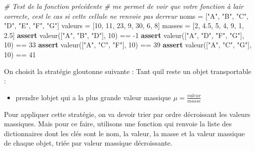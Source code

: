 \documentclass[
  paper=a4,
  ,captions=tableheading
]{scrartcl}
\newenvironment{Shaded}{}{}
\newcommand{\CommentTok}[1]{\textcolor[rgb]{0.38,0.63,0.69}{\textit{#1}}}
\newcommand{\ControlFlowTok}[1]{\textcolor[rgb]{0.00,0.44,0.13}{\textbf{#1}}}
\newcommand{\DecValTok}[1]{\textcolor[rgb]{0.25,0.63,0.44}{#1}}
\newcommand{\FloatTok}[1]{\textcolor[rgb]{0.25,0.63,0.44}{#1}}
\newcommand{\NormalTok}[1]{#1}
\newcommand{\OperatorTok}[1]{\textcolor[rgb]{0.40,0.40,0.40}{#1}}
\newcommand{\StringTok}[1]{\textcolor[rgb]{0.25,0.44,0.63}{#1}}
\providecommand{\tightlist}{%
  \setlength{\itemsep}{0pt}\setlength{\parskip}{0pt}}
\begin{document}
\begin{Shaded}
\begin{Highlighting}[]
\CommentTok{\# Test de la fonction précédente}
\CommentTok{\# me permet de voir que votre fonction à l\textquotesingle{}air correcte, c\textquotesingle{}est le cas si cette cellule ne renvoie pas d\textquotesingle{}erreur}
\NormalTok{noms }\OperatorTok{=}\NormalTok{ [}\StringTok{"A"}\NormalTok{, }\StringTok{"B"}\NormalTok{, }\StringTok{"C"}\NormalTok{, }\StringTok{"D"}\NormalTok{, }\StringTok{"E"}\NormalTok{, }\StringTok{"F"}\NormalTok{, }\StringTok{"G"}\NormalTok{]}
\NormalTok{valeurs }\OperatorTok{=}\NormalTok{ [}\DecValTok{10}\NormalTok{, }\DecValTok{11}\NormalTok{, }\DecValTok{23}\NormalTok{, }\DecValTok{9}\NormalTok{, }\DecValTok{30}\NormalTok{, }\DecValTok{6}\NormalTok{, }\DecValTok{8}\NormalTok{]}
\NormalTok{masses }\OperatorTok{=}\NormalTok{ [}\DecValTok{2}\NormalTok{, }\FloatTok{4.5}\NormalTok{, }\DecValTok{5}\NormalTok{, }\DecValTok{4}\NormalTok{, }\DecValTok{9}\NormalTok{, }\DecValTok{1}\NormalTok{, }\FloatTok{2.5}\NormalTok{]}
\ControlFlowTok{assert}\NormalTok{ valeur([}\StringTok{"A"}\NormalTok{, }\StringTok{"B"}\NormalTok{, }\StringTok{"D"}\NormalTok{], }\DecValTok{10}\NormalTok{) }\OperatorTok{==} \OperatorTok{{-}}\DecValTok{1}
\ControlFlowTok{assert}\NormalTok{ valeur([}\StringTok{"A"}\NormalTok{, }\StringTok{"D"}\NormalTok{, }\StringTok{"F"}\NormalTok{, }\StringTok{"G"}\NormalTok{], }\DecValTok{10}\NormalTok{) }\OperatorTok{==} \DecValTok{33}
\ControlFlowTok{assert}\NormalTok{ valeur([}\StringTok{"A"}\NormalTok{, }\StringTok{"C"}\NormalTok{, }\StringTok{"F"}\NormalTok{], }\DecValTok{10}\NormalTok{) }\OperatorTok{==} \DecValTok{39}
\ControlFlowTok{assert}\NormalTok{ valeur([}\StringTok{"A"}\NormalTok{, }\StringTok{"C"}\NormalTok{, }\StringTok{"G"}\NormalTok{], }\DecValTok{10}\NormalTok{) }\OperatorTok{==} \DecValTok{41}
\end{Highlighting}
\end{Shaded}

On choisit la stratégie gloutonne suivante : Tant qu\textquotesingle il
reste un objet transportable :

\begin{itemize}
\tightlist
\item
  prendre l\textquotesingle objet qui a la plus grande valeur massique
  \(\mu=\frac{valeur}{masse}\)
\end{itemize}

Pour appliquer cette stratégie, on va devoir trier par ordre décroissant
les valeurs massiques. Mais pour ce faire, utilisons une fonction qui
renvoie la liste des dictionnaires dont les clés sont le nom, la valeur,
la masse et la valeur massique de chaque objet, triée par valeur
massique décroissante.
\end{document}
